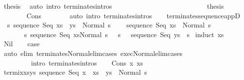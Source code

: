 \begin{isabellebody}
\ {\isacharquery}thesis\ \isamarkupfalse%
\ {\isacharparenleft}auto\ intro{\isacharcolon}\ terminates{\isachardot}intros{\isacharparenright}\isanewline
\ \ \ \ \ \ \ \ \isamarkupfalse%
\isanewline
\ \ \ \ \ \ \isamarkupfalse%
\isanewline
\ \ \ \ \isacommand{{\isacharbraceright}}\isamarkupfalse%
\isanewline
\ \ \ \ \isamarkupfalse%
\ \isamarkupfalse%
\ {\isacharquery}thesis\isanewline
\ \ \ \ \ \ \isamarkupfalse%
\ Cons\isanewline
\ \ \ \ \ \ \isamarkupfalse%
\ {\isacharparenleft}auto\ intro{\isacharcolon}\ terminates{\isachardot}intros{\isacharparenright}\isanewline
\ \ \isamarkupfalse%
\isanewline
{}\isamarkupfalse%
%
\endisatagproof
{\isafoldproof}%
%
\isadelimproof
\isanewline
%
\endisadelimproof
\isanewline
{}\isamarkupfalse%
\ terminates{\isacharunderscore}sequence{\isacharunderscore}appD{\isacharcolon}\ \isanewline
\ \ {\isachardoublequoteopen}{\isasymAnd}s{\isachardot}\ {\isasymGamma}{\isasymturnstile}sequence\ Seq\ {\isacharparenleft}xs\ {\isacharat}\ ys{\isacharparenright}\ {\isasymdown}\ Normal\ s\isanewline
\ \ \ {\isasymLongrightarrow}\ {\isasymGamma}{\isasymturnstile}sequence\ Seq\ xs\ {\isasymdown}\ Normal\ s\ {\isasymand}\isanewline
\ \ \ \ \ \ \ {\isacharparenleft}{\isasymforall}s{\isacharprime}{\isachardot}\ {\isasymGamma}{\isasymturnstile}{\isasymlangle}sequence\ Seq\ xs{\isacharcomma}Normal\ s\ {\isasymrangle}\ {\isasymRightarrow}\ s{\isacharprime}\ {\isasymlongrightarrow}\ \ {\isasymGamma}{\isasymturnstile}sequence\ Seq\ ys\ {\isasymdown}\ s{\isacharprime}{\isacharparenright}{\isachardoublequoteclose}\isanewline
%
\isadelimproof
%
\endisadelimproof
%
\isatagproof
{}\isamarkupfalse%
\ {\isacharparenleft}induct\ xs{\isacharparenright}\isanewline
\ \ \isamarkupfalse%
\ Nil\isanewline
\ \ \isamarkupfalse%
\ {\isacharquery}case\ \isanewline
\ \ \ \ \isamarkupfalse%
\ {\isacharparenleft}auto\ elim{\isacharcolon}\ terminates{\isacharunderscore}Normal{\isacharunderscore}elim{\isacharunderscore}cases\ exec{\isacharunderscore}Normal{\isacharunderscore}elim{\isacharunderscore}cases\ \isanewline
\ \ \ \ \ \ \ \ \ intro{\isacharcolon}\ terminates{\isachardot}intros{\isacharparenright}\isanewline
{}\isamarkupfalse%
\isanewline
\ \ \isamarkupfalse%
\ {\isacharparenleft}Cons\ x\ xs{\isacharparenright}\isanewline
\ \ \isamarkupfalse%
\ termi{\isacharunderscore}x{\isacharunderscore}xs{\isacharunderscore}ys{\isacharcolon}\ {\isachardoublequoteopen}{\isasymGamma}{\isasymturnstile}sequence\ Seq\ {\isacharparenleft}{\isacharparenleft}x\ {\isacharhash}\ xs{\isacharparenright}\ {\isacharat}\ ys{\isacharparenright}\ {\isasymdown}\ Normal\ s{\isachardoublequoteclose}\ \isamarkupfalse%

\end{isabellebody}
